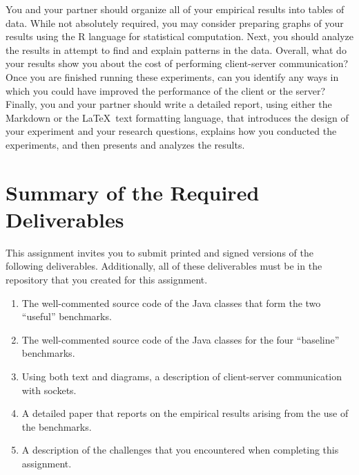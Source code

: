 You and your partner should organize all of your empirical results into tables of data. While not absolutely required,
you may consider preparing graphs of your results using the R language for statistical computation. Next, you should
analyze the results in attempt to find and explain patterns in the data. Overall, what do your results show you about
the cost of performing client-server communication? Once you are finished running these experiments, can you identify
any ways in which you could have improved the performance of the client or the server? Finally, you and your partner
should write a detailed report, using either the Markdown or the \LaTeX~text formatting language, that introduces the
design of your experiment and your research questions, explains how you conducted the experiments, and then presents and
analyzes the results.

\section*{Summary of the Required Deliverables}

This assignment invites you to submit printed and signed versions of the following deliverables. Additionally,
all of these deliverables must be in the repository that you created for this assignment.

\begin{enumerate}

    \item The well-commented source code of the Java classes that form the two ``useful'' benchmarks.

    \item The well-commented source code of the Java classes for the four ``baseline'' benchmarks.

    \item Using both text and diagrams, a description of client-server communication with sockets.

    \item A detailed paper that reports on the empirical results arising from the use of the benchmarks.

    \item A description of the challenges that you encountered when completing this assignment.

\end{enumerate}


